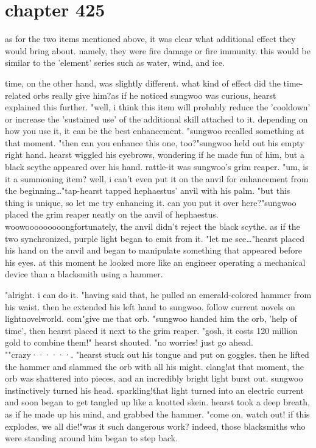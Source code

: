 \section{chapter 425}

as for the two items mentioned above, it was clear what additional effect they would bring about.
 namely, they were fire damage or fire immunity.
 this would be similar to the 'element' series such as water, wind, and ice.





time, on the other hand, was slightly different.
 what kind of effect did the time-related orbs really give him?as if he noticed sungwoo was curious, hearst explained this further.
"well, i think this item will probably reduce the 'cooldown' or increase the 'sustained use' of the additional skill attached to it.
 depending on how you use it, it can be the best enhancement.
"sungwoo recalled something at that moment.
"then can you enhance this one, too?"sungwoo held out his empty right hand.
 hearst wiggled his eyebrows, wondering if he made fun of him, but a black scythe appeared over his hand.
rattle-it was sungwoo's grim reaper.
"um, is it a summoning item? well, i can't even put it on the anvil for enhancement from the beginning…"tap-hearst tapped hephaestus' anvil with his palm.
"but this thing is unique, so let me try enhancing it.
 can you put it over here?"sungwoo placed the grim reaper neatly on the anvil of hephaestus.
woowooooooooongfortunately, the anvil didn't reject the black scythe.
 as if the two synchronized, purple light began to emit from it.
"let me see…"hearst placed his hand on the anvil and began to manipulate something that appeared before his eyes.
 at this moment he looked more like an engineer operating a mechanical device than a blacksmith using a hammer.

"alright.
 i can do it.
"having said that, he pulled an emerald-colored hammer from his waist.
 then he extended his left hand to sungwoo.
follow current novels on lightnovelworld.
com"give me that orb.
"sungwoo handed him the orb, 'help of time', then hearst placed it next to the grim reaper.
"gosh, it costs 120 million gold to combine them!" hearst shouted.
"no worries! just go ahead.
""crazy······.
"hearst stuck out his tongue and put on goggles.
 then he lifted the hammer and slammed the orb with all his might.
clang!at that moment, the orb was shattered into pieces, and an incredibly bright light burst out.
sungwoo instinctively turned his head.
sparkling!that light turned into an electric current and soon began to get tangled up like a knotted skein.
hearst took a deep breath, as if he made up his mind, and grabbed the hammer.
"come on, watch out! if this explodes, we all die!"was it such dangerous work? indeed, those blacksmiths who were standing around him began to step back.

